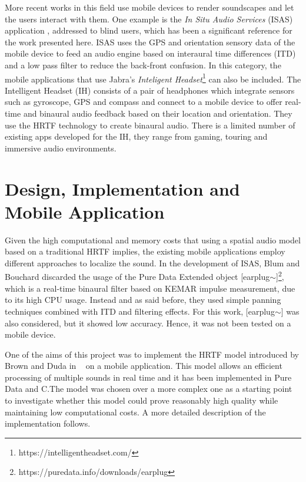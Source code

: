 \documentclass[journal]{IEEEtran}
\begin{document}
More recent works in this field use mobile devices to render soundscapes and let the users interact with them. One example is the \emph{In Situ Audio Services} (ISAS) application \cite{aroundMe}, addressed to blind users, which has been a significant reference for the work presented here. ISAS uses the GPS and orientation sensory data of the mobile device to feed an audio engine based on interaural time differences (ITD) and a low pass filter to reduce the back-front confusion. In this category, the mobile applications that use Jabra's \emph{Inteligent Headset}\footnote{https://intelligentheadset.com/} can also be included. The Intelligent Headset (IH) consists of a pair of headphones which integrate sensors such as gyroscope, GPS and compass and connect to a mobile device to offer real-time and binaural audio feedback based on their location and orientation. They use the HRTF technology to create binaural audio. There is a limited number of existing apps developed for the IH, they range from gaming, touring and immersive audio environments.

\section{Design, Implementation and Mobile Application}

Given the high computational and memory costs that using a spatial audio model based on a traditional HRTF implies, the existing mobile applications employ different approaches to localize the sound. In the development of ISAS,  Blum and Bouchard discarded the usage of the Pure Data Extended object [earplug$\sim$]\footnote{https://puredata.info/downloads/earplug}, which is a real-time binaural filter based on KEMAR impulse measurement, due to its high CPU usage. Instead and as said before, they used simple panning techniques combined with ITD and filtering effects. For this work, [earplug$\sim$] was also considered, but it showed low accuracy. Hence, it was not been tested on a mobile device.

One of the aims of this project was to implement the HRTF model introduced by Brown and Duda in ~\cite{Brown1997} on a mobile application. This model allows an efficient processing of multiple sounds in real time and it has been implemented  in Pure Data and C.The model was chosen over a more complex one as a starting point to investigate whether this model could prove reasonably high quality while maintaining low computational costs. A more detailed description of the implementation follows.
\end{document}
